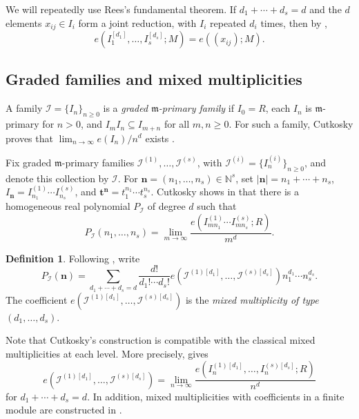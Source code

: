 \documentclass[reqno,12pt]{amsart}
\theoremstyle{plain}
\theoremstyle{definition}
\newtheorem{defn}[prop]{Definition}
\theoremstyle{remark}
\newcommand{\N}{\mathbb N}
\numberwithin{equation}{section}
\begin{document}
We will repeatedly use Rees's fundamental theorem. If
$d_1+\cdots+d_s=d$ and the $d$ elements $x_{ij}\in I_i$ form a joint
reduction, with $I_i$ repeated $d_i$ times, then by \cite[Theorem~17.4.9]{SwansonHuneke},
\begin{equation}
\label{eq:classical-rees}
e(I_1^{[d_1]},\ldots,I_s^{[d_s]};M)=e((x_{ij});M).
\end{equation}


\subsection*{Graded families and mixed multiplicities}

A family $\mathcal I=\{I_n\}_{n\geq0}$ is a \emph{graded
$\mathfrak m$-primary family} if $I_0=R$, each $I_n$ is
$\mathfrak m$-primary for $n>0$, and $I_mI_n\subseteq I_{m+n}$ for all
$m,n\geq0$. For such a family, Cutkosky proves that
$\lim_{n\to\infty}e(I_n)/n^d$ exists
\cite[Theorem~1.3]{Cutkosky2026}.

Fix graded $\mathfrak m$-primary families
$\mathcal I^{(1)},\ldots,\mathcal I^{(s)}$, with
$\mathcal I^{(i)}=\{I_n^{(i)}\}_{n\geq0}$, and denote this collection by
$\boldsymbol{\mathcal I}$. For $\mathbf n=(n_1,\ldots,n_s)\in\N^s$, set
$|\mathbf n|=n_1+\cdots+n_s$,
$I_{\mathbf n}=I_{n_1}^{(1)}\cdots I_{n_s}^{(s)}$, and
$\mathbf t^{\mathbf n}=t_1^{n_1}\cdots t_s^{n_s}$. Cutkosky shows in \cite[Theorem~1.6]{Cutkosky2026} that there is a
homogeneous real polynomial $P_{\boldsymbol{\mathcal I}}$ of degree $d$
such that
\[
P_{\boldsymbol{\mathcal I}}(n_1,\ldots,n_s)
=
\lim_{m\to\infty}
\frac{e(I_{mn_1}^{(1)}\cdots I_{mn_s}^{(s)};R)}{m^d}.
\]

\begin{defn}
\label{def:mixed-family}
Following \cite[Theorem~1.6]{Cutkosky2026}, write
\[
P_{\boldsymbol{\mathcal I}}(\mathbf n)
=
\sum_{d_1+\cdots+d_s=d}
\frac{d!}{d_1!\cdots d_s!}
 e\!\left(\mathcal I^{(1)[d_1]},\ldots,
 \mathcal I^{(s)[d_s]}\right)
 n_1^{d_1}\cdots n_s^{d_s}.
\]
The coefficient
$e(\mathcal I^{(1)[d_1]},\ldots,\mathcal I^{(s)[d_s]})$ is the
\emph{mixed multiplicity of type $(d_1,\ldots,d_s)$}.
\end{defn}

Note that  Cutkosky's construction is compatible with the classical mixed
multiplicities at each level. More precisely,
\cite[Equation~(9)]{Cutkosky2026} gives
\begin{equation}
\label{eq:cutkosky-level-limit}
e\!\left(\mathcal I^{(1)[d_1]},\ldots,\mathcal I^{(s)[d_s]}\right)
=
\lim_{n\to\infty}
\frac{e(I_n^{(1)[d_1]},\ldots,I_n^{(s)[d_s]};R)}{n^d}
\end{equation}
for $d_1+\cdots+d_s=d$. In addition, mixed multiplicities with coefficients in a
finite module are constructed in \cite[Theorem~3.4]{Cutkosky2026}.
\end{document}
